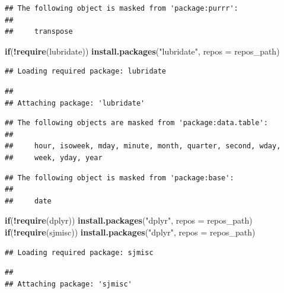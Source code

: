 \documentclass[]{article}
\newenvironment{Shaded}{\begin{snugshade}}{\end{snugshade}}
\newcommand{\ControlFlowTok}[1]{\textcolor[rgb]{0.13,0.29,0.53}{\textbf{#1}}}
\newcommand{\DataTypeTok}[1]{\textcolor[rgb]{0.13,0.29,0.53}{#1}}
\newcommand{\KeywordTok}[1]{\textcolor[rgb]{0.13,0.29,0.53}{\textbf{#1}}}
\newcommand{\NormalTok}[1]{#1}
\newcommand{\OperatorTok}[1]{\textcolor[rgb]{0.81,0.36,0.00}{\textbf{#1}}}
\newcommand{\StringTok}[1]{\textcolor[rgb]{0.31,0.60,0.02}{#1}}
\begin{document}
\begin{verbatim}
## The following object is masked from 'package:purrr':
## 
##     transpose
\end{verbatim}

\begin{Shaded}
\begin{Highlighting}[]
\ControlFlowTok{if}\NormalTok{(}\OperatorTok{!}\KeywordTok{require}\NormalTok{(lubridate)) }\KeywordTok{install.packages}\NormalTok{(}\StringTok{"lubridate"}\NormalTok{, }\DataTypeTok{repos =}\NormalTok{ repos_path)}
\end{Highlighting}
\end{Shaded}

\begin{verbatim}
## Loading required package: lubridate
\end{verbatim}

\begin{verbatim}
## 
## Attaching package: 'lubridate'
\end{verbatim}

\begin{verbatim}
## The following objects are masked from 'package:data.table':
## 
##     hour, isoweek, mday, minute, month, quarter, second, wday,
##     week, yday, year
\end{verbatim}

\begin{verbatim}
## The following object is masked from 'package:base':
## 
##     date
\end{verbatim}

\begin{Shaded}
\begin{Highlighting}[]
\ControlFlowTok{if}\NormalTok{(}\OperatorTok{!}\KeywordTok{require}\NormalTok{(dplyr)) }\KeywordTok{install.packages}\NormalTok{(}\StringTok{"dplyr"}\NormalTok{, }\DataTypeTok{repos =}\NormalTok{ repos_path)}
\ControlFlowTok{if}\NormalTok{(}\OperatorTok{!}\KeywordTok{require}\NormalTok{(sjmisc)) }\KeywordTok{install.packages}\NormalTok{(}\StringTok{"dplyr"}\NormalTok{, }\DataTypeTok{repos =}\NormalTok{ repos_path)}
\end{Highlighting}
\end{Shaded}

\begin{verbatim}
## Loading required package: sjmisc
\end{verbatim}

\begin{verbatim}
## 
## Attaching package: 'sjmisc'
\end{verbatim}
\end{document}
